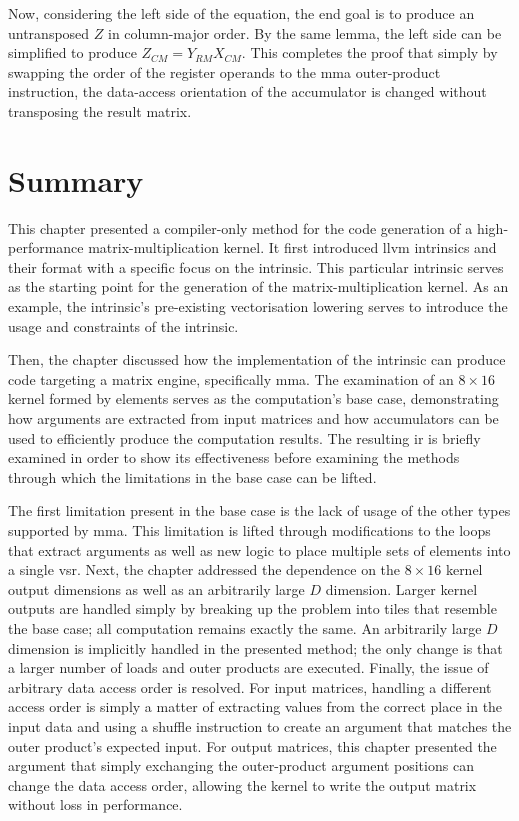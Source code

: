 \documentclass[\main/thesis.tex]{subfiles}
\begin{document}
Now, considering the left side of the equation, the end goal is to produce an untransposed $Z$ in column-major order.
By the same lemma, the left side can be simplified to produce $Z_{CM} = Y_{RM}X_{CM}$.
This completes the proof that simply by swapping the order of the register operands to the \gls{mma} outer-product instruction, the data-access orientation of the accumulator is changed without transposing the result matrix.

\section{Summary}
This chapter presented a compiler-only method for the code generation of a high-performance matrix-multiplication kernel.
It first introduced \gls{llvm} \glspl{intrinsic} and their format with a specific focus on the  \gls{intrinsic}.
This particular \gls{intrinsic} serves as the starting point for the generation of the matrix-multiplication kernel.
As an example, the \gls{intrinsic}'s pre-existing vectorisation lowering serves to introduce the usage and constraints of the \gls{intrinsic}.

Then, the chapter discussed how the implementation of the \gls{intrinsic} can produce code targeting a \gls{matrix engine}, specifically \gls{mma}.
The examination of an $8 \times 16$ kernel formed by  elements serves as the computation's base case, demonstrating how arguments are extracted from input matrices and how accumulators can be used to efficiently produce the computation results.
The resulting \gls{ir} is briefly examined in order to show its effectiveness before examining the methods through which the limitations in the base case can be lifted.

The first limitation present in the base case is the lack of usage of the other types supported by \gls{mma}.
This limitation is lifted through modifications to the loops that extract arguments as well as new logic to place multiple sets of elements into a single \gls{vsr}.
Next, the chapter addressed the dependence on the $8 \times 16$ kernel output dimensions as well as an arbitrarily large $D$ dimension.
Larger kernel outputs are handled simply by breaking up the problem into tiles that resemble the base case; all computation remains exactly the same.
An arbitrarily large $D$ dimension is implicitly handled in the presented method; the only change is that a larger number of loads and outer products are executed.
Finally, the issue of arbitrary data access order is resolved.
For input matrices, handling a different access order is simply a matter of extracting values from the correct place in the input data and using a shuffle instruction to create an argument that matches the outer product's expected input.
For output matrices, this chapter presented the argument that simply exchanging the outer-product argument positions can change the data access order, allowing the kernel to write the output matrix without loss in performance.
\end{document}
